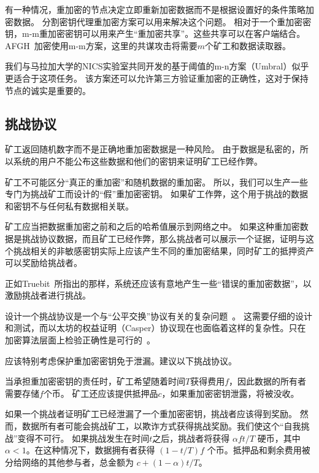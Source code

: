 \documentclass[longbibliography,nofootinbib]{revtex4-1}
\begin{document}
有一种情况，重加密的节点决定立即重新加密数据而不是根据设置好的条件策略加密数据。 分割密钥代理重加密方案可以用来解决这个问题。
    相对于一个重加密密钥，m-m重加密密钥可以用来产生“重加密共享”。这些共享可以在客户端结合。AFGH~\cite{AFGH}加密使用m-m方案，这里的共谋攻击将需要$m$个矿工和数据读取器。
    
    我们与马拉加大学的NICS实验室共同开发的基于阈值的m-n方案（Umbral）似乎更适合于这项任务。 该方案还可以允许第三方验证重加密的正确性，这对于保持节点的诚实是重要的。

\subsection{挑战协议}
\label{sec:challenge-protocol}

矿工返回随机数字而不是正确地重加密数据是一种风险。 由于数据是私密的，所以系统的用户不能公布这些数据和他们的密钥来证明矿工已经作弊。

    矿工不可能区分“真正的重加密”和随机数据的重加密。 所以，我们可以生产一些专门为挑战矿工而设计的“假”重加密密钥。 如果矿工作弊，这个用于挑战的数据和密钥不与任何私有数据相关联。
    
    矿工应当把数据重加密之前和之后的哈希值展示到网络之中。 如果这种重加密数据是挑战协议数据，而且矿工已经作弊，那么挑战者可以展示一个证据，证明与这个挑战相关的非敏感密钥实际上应该产生不同的重加密结果，同时矿工的抵押资产可以奖励给挑战者。
    
    正如Truebit~\cite{truebit}所指出的那样，系统还应该有意地产生一些“错误的重加密数据”，以激励挑战者进行挑战。

        设计一个挑战协议是一个与“公平交换”协议有关的复杂问题~\cite{BitcoinMPC2016,Bentov2014,AccountableStorage}。 这需要仔细的设计和测试，而以太坊的权益证明（Casper）协议现在也面临着这样的复杂性。只在加密算法层面上检验正确性是可行的~\cite{Zhou2002}。
    
    应该特别考虑保护重加密密钥免于泄漏。建议以下挑战协议。
    
    当承担重加密密钥的责任时，矿工希望随着时间$T$获得费用$f$，因此数据的所有者需要存储$f$个币。 矿工还应该提供抵押品$c$，如果重加密密钥泄露，将被没收。

        如果一个挑战者证明矿工已经泄漏了一个重加密密钥，挑战者应该得到奖励。 然而，数据所有者可能会挑战矿工，以欺诈方式获得挑战奖励。我们使这个“自我挑战”变得不可行。 如果挑战发生在时间$t$之后，挑战者将获得 $\alpha f t/T$ 硬币，其中$\alpha < 1$。在这种情况下，数据拥有者获得  $(1 - t/T) f$  个币。抵押品和剩余费用被分给网络的其他参与者，总金额为 $c + (1 - \alpha) t/T$。
\end{document}
